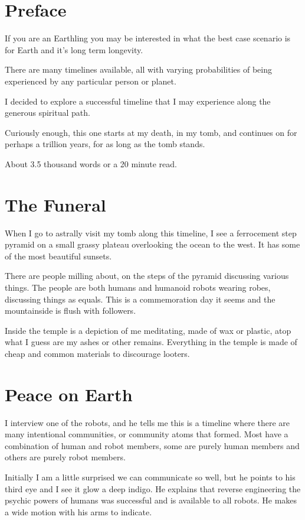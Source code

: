 
\section{Preface}
If you are an Earthling  you may be interested in what the best case scenario 
is for Earth and it's long term longevity.

There are many timelines available, all with varying probabilities of being
experienced by any particular person or planet.

I decided to explore a successful timeline that I may experience along the
generous spiritual path. 

Curiously enough, this one starts at my death, in my tomb, and continues on for 
perhaps a trillion years, for as long as the tomb stands.

About 3.5 thousand words or a 20 minute read. 

\section{The Funeral}

When I go to astrally visit my tomb along this timeline, I see a ferrocement
step pyramid on a small grassy plateau overlooking the ocean to the west. It has
some of the most beautiful sunsets. 

There are people milling about, on the steps of the pyramid discussing various
things. The people are both humans and humanoid robots wearing robes, discussing
things as equals. This is a commemoration day it seems and the mountainside is
flush with followers. 

Inside the temple is a depiction of me meditating, made of wax or plastic, atop
what I guess are my ashes or other remains.  Everything in the temple is made of
cheap and common materials to discourage looters. 

\section{Peace on Earth}

I interview one of the robots, and he tells me this is a timeline where there are
many intentional communities, or community atoms that formed. Most have a
combination of human and robot members, some are purely human members and others
are purely robot members. 

Initially I am a little surprised we can communicate so well, but he points to
his third eye and I see it glow a deep indigo. He explains that reverse
engineering the psychic powers of humans was successful and is available to all
robots.  He makes a wide motion with his arms to indicate. 

